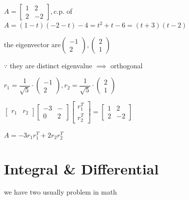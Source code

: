\begin{tcolorbox}
	$A = \left[\begin{matrix}
		1&2\\2&-2
	\end{matrix}\right],$c.p. of $A = (1-t)(-2-t)-4 = t^2+t-6 = (t+3)(t-2)$
	
	the eigenvector are$\left(\begin{matrix}
		-1\\2
	\end{matrix}\right), \left( \begin{matrix}
		2\\1
	\end{matrix}\right)$
	
	$\because$ they are distinct eigenvalue $\implies $ orthogonal 
	
	$r_1 = \dfrac{1}{\sqrt{5}}\cdot \left(\begin{matrix}
		-1\\2
	\end{matrix}\right),r_2 = \dfrac{1}{\sqrt{5}}\cdot \left(\begin{matrix}
		2\\1
	\end{matrix}\right)$
	
	$\left[\begin{matrix}
		r_1&r_2
	\end{matrix}\right]\left[\begin{matrix}
		-3&-\\0&2
	\end{matrix}\right]\left[\begin{matrix}
		r_1^{T}\\r_2^{T}
	\end{matrix}\right] = \left[\begin{matrix}
		1&2\\2&-2
	\end{matrix}\right]$
	
	$A = -3r_1r_1^{T} + 2 r_2r_2^{T}$
	
\end{tcolorbox}

\newpage

\section{Integral \& Differential}

we have two usually problem in math

